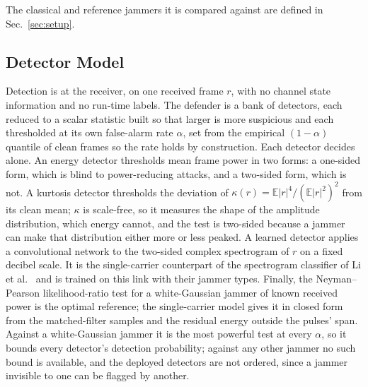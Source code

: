 \documentclass[conference]{IEEEtran}
\begin{document}
The classical and reference jammers it is compared against are defined in Sec.~\ref{sec:setup}.

\subsection{Detector Model}
\label{sec:detector}
Detection is at the receiver, on one received frame $r$, with no channel state information and no run-time labels.
The defender is a bank of detectors, each reduced to a scalar statistic built so that larger is more suspicious and each thresholded at its own false-alarm rate $\alpha$, set from the empirical $(1{-}\alpha)$ quantile of clean frames so the rate holds by construction.
Each detector decides alone.
An energy detector thresholds mean frame power in two forms: a one-sided form, which is blind to power-reducing attacks, and a two-sided form, which is not.
A kurtosis detector thresholds the deviation of $\kappa(r)=\mathbb{E}|r|^4/(\mathbb{E}|r|^2)^2$ from its clean mean; $\kappa$ is scale-free, so it measures the shape of the amplitude distribution, which energy cannot, and the test is two-sided because a jammer can make that distribution either more or less peaked.
A learned detector applies a convolutional network to the two-sided complex spectrogram of $r$ on a fixed decibel scale.
It is the single-carrier counterpart of the spectrogram classifier of Li et al.~\cite{9707819} and is trained on this link with their jammer types.
Finally, the Neyman--Pearson likelihood-ratio test for a white-Gaussian jammer of known received power is the optimal reference; the single-carrier model gives it in closed form from the matched-filter samples and the residual energy outside the pulses' span.
Against a white-Gaussian jammer it is the most powerful test at every $\alpha$, so it bounds every detector's detection probability; against any other jammer no such bound is available, and the deployed detectors are not ordered, since a jammer invisible to one can be flagged by another.
\end{document}

